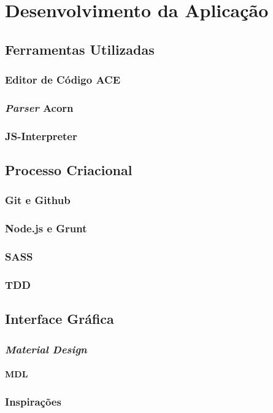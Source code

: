 
\chapter{Desenvolvimento da Aplicação}

\section{Ferramentas Utilizadas}

\subsection{Editor de Código ACE}

\subsection{\textit{Parser} Acorn}

\subsection{JS-Interpreter}

\section{Processo Criacional}

\subsection{Git e Github}

\subsection{Node.js e Grunt}

\subsection{SASS}

\subsection{TDD}

\section{Interface Gráfica}

\subsection{\textit{Material Design}}

\subsubsection{MDL}

\subsection{Inspirações}
